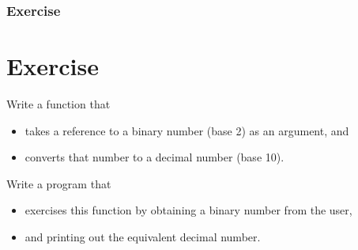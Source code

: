 \documentclass{beamer}
\begin{document}
\begin{frame}
    \frametitle{Exercise}
    \section{Exercise} %
    \label{sec:exercise}
    Write a function that
    \begin{itemize}
        \item takes a reference to a binary number (base 2) as an argument, and
        \item converts that number to a decimal number (base 10).
    \end{itemize}
    Write a program that
        \begin{itemize}
            \item exercises this function by obtaining a binary number from the user,
            \item and printing out the equivalent decimal number.
        \end{itemize}
\end{frame}
\end{document}
